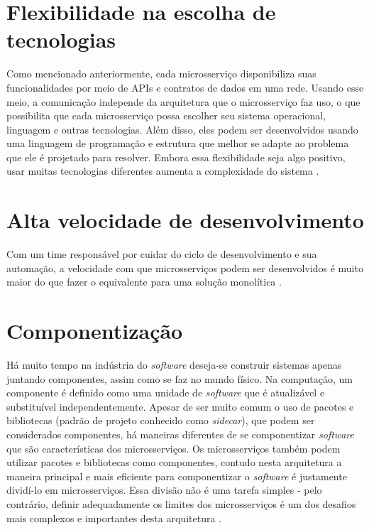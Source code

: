 
\section{Flexibilidade na escolha de tecnologias}

Como mencionado anteriormente, cada microsserviço disponibiliza suas funcionalidades por meio de APIs e contratos de dados em uma rede. Usando esse meio, a comunicação independe da arquitetura que o microsserviço faz uso, o que possibilita que cada microsserviço possa escolher seu sistema operacional, linguagem e outras tecnologias. Além disso, eles podem ser desenvolvidos usando uma linguagem de programação e estrutura que melhor se adapte ao problema que ele é projetado para resolver. Embora essa flexibilidade seja algo positivo, usar muitas tecnologias diferentes aumenta a complexidade do sistema \cite{oracle_microservices, Familiar2015}.

\section{Alta velocidade de desenvolvimento}

Com um time responsável por cuidar do ciclo de desenvolvimento e sua automação, a velocidade com que microsserviços podem ser desenvolvidos é muito maior do que fazer o equivalente para uma solução monolítica \cite{Familiar2015}.

\section{Componentização}

Há muito tempo na indústria do \emph{software} deseja-se construir sistemas apenas juntando componentes, assim como se faz no mundo físico. Na computação, um componente é definido como uma unidade de \emph{software} que é atualizável e substituível independentemente. Apesar de ser muito comum o uso de pacotes e bibliotecas (padrão de projeto conhecido como \emph{sidecar}), que podem ser considerados componentes, há maneiras diferentes de se componentizar \emph{software} que são características dos microsserviços. Os microsserviços também podem utilizar pacotes e bibliotecas como componentes, contudo nesta arquitetura a maneira principal e mais eficiente para componentizar o \emph{software} é justamente dividí-lo em microsserviços. Essa divisão não é uma tarefa simples - pelo contrário, definir adequadamente os limites dos microsserviços é um dos desafios mais complexos e importantes desta arquitetura \cite{martin-fowler-microservices}.

